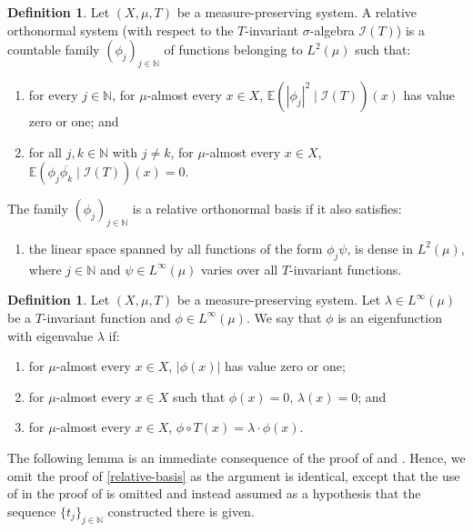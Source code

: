\documentclass[letter, 11pt]{article}
\theoremstyle{definition}
\newtheorem{definition}[theorem]{Definition}
\theoremstyle{plain}
\newcommand{\N}{\mathbb{N}}
\newcommand{\1}{\mathbbm{1}}
\begin{document}
\begin{definition}\label{localization-lemma}
    Let $(X,\mu,T)$ be a measure-preserving system. A relative orthonormal system (with respect to the $T$-invariant $\sigma$-algebra $\mathcal{I}(T)$) is a countable family $(\phi_j)_{j\in \N}$ of functions belonging to $L^2(\mu)$ such that: 
    \begin{enumerate}
        \item  for every $j \in \mathbb{N}$, for $\mu$-almost every $x\in X$, $ \mathbb{E}(\left|\phi_j\right|^2 \mid \mathcal{I}(T))(x)$ has value zero or one; and
        \item for all $j, k \in \mathbb{N}$ with $j \neq k$, for $\mu$-almost every $x\in X$, $ \mathbb{E}(\phi_j \overline{\phi_k} \mid \mathcal{I}(T))(x)=0.$  
    \end{enumerate}
The family $\left(\phi_j\right)_{j \in \mathbb{N}}$ is a relative orthonormal basis if it also satisfies:
\begin{enumerate}
\item[\textbf{3.}] the linear space spanned by all functions of the form $\phi_j \psi$, is dense in $L^2(\mu)$, where $j \in \mathbb{N}$ and $\psi \in L^{\infty}(\mu)$ varies over all $T$-invariant functions.
    \end{enumerate}
\end{definition}

\begin{definition}
Let $(X,\mu,T)$ be a measure-preserving system. Let $\lambda \in L^{\infty}(\mu)$ be a $T$-invariant function and $\phi \in L^{\infty}(\mu)$. We say that $\phi$ is an eigenfunction with eigenvalue $\lambda$ if:
  \begin{enumerate}
      \item  for $\mu$-almost every $x \in X$, $|\phi(x)|$ has value zero or one;
\item  for $\mu$-almost every $x \in X$ such that $\phi(x)=0$, $\lambda(x)=0$; and
\item  for $\mu$-almost every $x\in X$, $\phi \circ T(x)=\lambda \cdot \phi(x)$.
  \end{enumerate}
\end{definition}
The following lemma is an immediate consequence of the proof of \cite[Lemma 5.8]{FRANTZIKINAKIS_HOST_2018} and \cite[Theorem 5.2]{FRANTZIKINAKIS_HOST_2018}. Hence, we omit the proof of \cref{relative-basis} as the argument is identical, except that the use of \cite[Proposition 5.6]{FRANTZIKINAKIS_HOST_2018} in the proof of \cite[Lemma 5.8]{FRANTZIKINAKIS_HOST_2018} is omitted and instead assumed as a hypothesis that the sequence $\{t_j\}_{j\in \N}$ constructed there is given.
\end{document}
